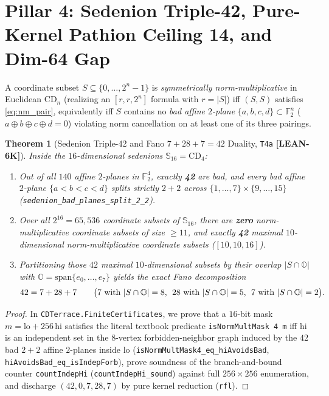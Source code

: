 \documentclass[11pt,reqno]{amsart}
\newcommand{\code}[1]{\textnormal{\texttt{\small\nolinkurl{#1}}}}
\newcommand{\cmd}[1]{\textnormal{\texttt{\small #1}}}
\theoremstyle{plain}
\newtheorem{theorem}{Theorem}[section]
\theoremstyle{definition}
\theoremstyle{remark}
\newcommand{\tagLean}{\mbox{\textsf{\textbf{\color{oiBlue}[LEAN-6K]}}}}
\newcommand{\CD}{\mathrm{CD}}
\newcommand{\OO}{\mathbb{O}}
\newcommand{\SSed}{\mathbb{S}_{16}}
\newcommand{\F}{\mathbb{F}}
\begin{document}
\section{Pillar 4: Sedenion Triple-42, Pure-Kernel Pathion Ceiling 14, and Dim-64 Gap}
\label{sec:pillar4}

A coordinate subset $S \subseteq \{0, \dots, 2^n - 1\}$ is \emph{symmetrically
norm-multiplicative} in Euclidean $\CD_n$ (realizing an $[r, r, 2^n]$ formula with $r = |S|$)
iff $(S, S)$ satisfies \eqref{eq:nm_pair}, equivalently iff $S$ contains no \emph{bad affine
$2$-plane} $\{a, b, c, d\} \subset \F_2^n$ ($a \oplus b \oplus c \oplus d = 0$) violating norm
cancellation on at least one of its three pairings.

\begin{theorem}[Sedenion Triple-42 and Fano $7 + 28 + 7 = 42$ Duality, \texttt{T4a} \tagLean]
\label{thm:t4a}
Inside the $16$-dimensional sedenions $\SSed = \CD_4$:
\begin{enumerate}[leftmargin=2em]
  \item Out of all $140$ affine $2$-planes in $\F_2^4$, exactly \textbf{42} are bad, and
    \emph{every} bad affine $2$-plane $\{a < b < c < d\}$ splits strictly $2 + 2$ across
    $\{1,\dots,7\} \times \{9,\dots,15\}$ (\code{sedenion_bad_planes_split_2_2}).
  \item Over all $2^{16} = 65{,}536$ coordinate subsets of $\SSed$, there are \textbf{zero}
    norm-multiplicative coordinate subsets of size $\ge 11$, and exactly \textbf{42}
    maximal $10$-dimensional norm-multiplicative coordinate subsets ($[10, 10, 16]$).
  \item Partitioning those $42$ maximal $10$-dimensional subsets by their overlap $|S \cap \OO|$
    with $\OO = \mathrm{span}\{e_0, \dots, e_7\}$ yields the exact Fano decomposition
    \begin{equation}
      42 = 7 + 28 + 7 \qquad
      \bigl(\text{$7$ with $|S\cap\OO|=8$,\; $28$ with $|S\cap\OO|=5$,\; $7$ with $|S\cap\OO|=2$}\bigr).
    \end{equation}
\end{enumerate}
\end{theorem}

\begin{proof}
In \code{CDTerrace.FiniteCertificates}, we prove that a $16$-bit mask $m = \mathrm{lo} + 256\,\mathrm{hi}$
satisfies the literal textbook predicate \cmd{isNormMultMask 4 m} iff $\mathrm{hi}$ is an
independent set in the $8$-vertex forbidden-neighbor graph induced by the $42$ bad $2+2$ affine
$2$-planes inside $\mathrm{lo}$ (\code{isNormMultMask4_eq_hiAvoidsBad},
\code{hiAvoidsBad_eq_isIndepForb}), prove soundness of the branch-and-bound counter
\code{countIndepHi} (\code{countIndepHi_sound}) against full $256 \times 256$ enumeration, and
discharge $(42, 0, 7, 28, 7)$ by pure kernel reduction (\code{rfl}).
\end{proof}
\end{document}
